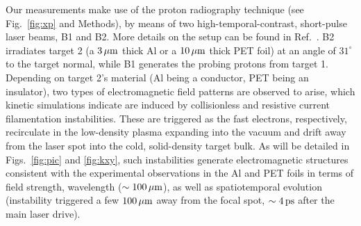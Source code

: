 \documentclass[aps,twocolumn,showpacs,superscriptaddress]{revtex4}
\begin{document}
Our measurements make use of the proton radiography technique (see Fig.~\ref{fig:xp} and Methods), by means of two high-temporal-contrast, short-pulse laser beams, B1 and B2. More details on the setup can be found in Ref.~\cite{RSI_Albertazzi_2015}.
B2 irradiates target 2 (a $3\,\rm \mu m$ thick Al or a $10\,\rm \mu m$ thick PET foil) at an angle of $31^\circ$ to the target normal, while B1 generates the probing protons from target 1. Depending on target 2's material (Al being a conductor, PET being an insulator), two types of electromagnetic field patterns are observed to arise, which kinetic simulations indicate are induced by collisionless and resistive current filamentation instabilities. These are triggered as the fast electrons, respectively, recirculate in the low-density plasma expanding into the vacuum and drift away from the laser spot into the cold, solid-density target bulk. As will be detailed in Figs.~\ref{fig:pic} and \ref{fig:kxy}, such instabilities generate electromagnetic structures consistent with the experimental observations in the Al and PET foils in terms of field strength, wavelength ($\sim 100\,\rm \mu m$), as well as spatiotemporal evolution (instability triggered a few $100\,\rm \mu m$ away from the focal spot, $\sim 4\,\rm ps$ after the main laser drive).
%
\end{document}
